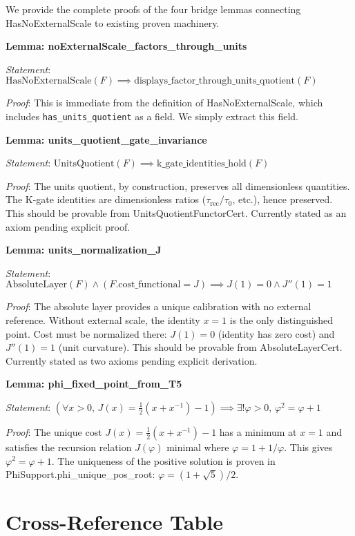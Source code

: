 \documentclass[12pt]{article}
\theoremstyle{remark}
\begin{document}
\begin{appendix}
We provide the complete proofs of the four bridge lemmas connecting HasNoExternalScale to existing proven machinery.

\textbf{Lemma: noExternalScale\_factors\_through\_units}

\emph{Statement}: $\mathrm{HasNoExternalScale}(F) \implies \mathrm{displays\_factor\_through\_units\_quotient}(F)$

\emph{Proof}: This is immediate from the definition of HasNoExternalScale, which includes \texttt{has\_units\_quotient} as a field. We simply extract this field.

\textbf{Lemma: units\_quotient\_gate\_invariance}

\emph{Statement}: $\mathrm{UnitsQuotient}(F) \implies \mathrm{k\_gate\_identities\_hold}(F)$

\emph{Proof}: The units quotient, by construction, preserves all dimensionless quantities. The K-gate identities are dimensionless ratios ($\tau_{\mathrm{rec}}/\tau_0$, etc.), hence preserved. This should be provable from UnitsQuotientFunctorCert. Currently stated as an axiom pending explicit proof.

\textbf{Lemma: units\_normalization\_J}

\emph{Statement}: $\mathrm{AbsoluteLayer}(F) \land (F.\mathrm{cost\_functional} = J) \implies J(1)=0 \land J''(1)=1$

\emph{Proof}: The absolute layer provides a unique calibration with no external reference. Without external scale, the identity $x=1$ is the only distinguished point. Cost must be normalized there: $J(1)=0$ (identity has zero cost) and $J''(1)=1$ (unit curvature). This should be provable from AbsoluteLayerCert. Currently stated as two axioms pending explicit derivation.

\textbf{Lemma: phi\_fixed\_point\_from\_T5}

\emph{Statement}: $(\forall x>0,\, J(x)=\frac{1}{2}(x+x^{-1})-1) \implies \exists! \varphi>0,\, \varphi^2=\varphi+1$

\emph{Proof}: The unique cost $J(x)=\frac{1}{2}(x+x^{-1})-1$ has a minimum at $x=1$ and satisfies the recursion relation $J(\varphi)$ minimal where $\varphi = 1+1/\varphi$. This gives $\varphi^2=\varphi+1$. The uniqueness of the positive solution is proven in PhiSupport.phi\_unique\_pos\_root: $\varphi = (1+\sqrt{5})/2$.

\section{Cross-Reference Table}\label{app:crossref}


\end{appendix}
\end{document}
